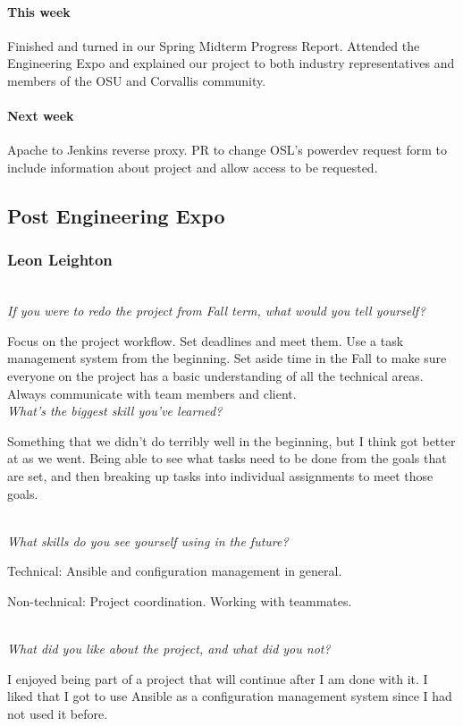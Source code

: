 \documentclass[10pt,letterpaper,onecolumn,draftclsnofoot]{IEEEtran}
\begin{document}
\paragraph{This week}Finished and turned in our Spring Midterm Progress Report.  
Attended the Engineering Expo and explained our project to both industry representatives and members of the OSU and Corvallis community.  
\paragraph{Next week}Apache to Jenkins reverse proxy.  
PR to change OSL's powerdev request form to include information about project and allow access to be requested.

\subsection{Post Engineering Expo}
\subsubsection{Leon Leighton}
\textit{\\If you were to redo the project from Fall term, what would you tell yourself?}

Focus on the project workflow. Set deadlines and meet them. Use a task management system from the beginning. Set aside time in the Fall to make sure everyone on the project has a basic understanding of all the technical areas. Always communicate with team members and client.
\textit{\\What's the biggest skill you've learned?}

Something that we didn't do terribly well in the beginning, but I think got better at as we went. Being able to see what tasks need to be done from the goals that are set, and then breaking up tasks into individual assignments to meet those goals.

\textit{\\What skills do you see yourself using in the future?}

Technical: Ansible and configuration management in general.

Non-technical: Project coordination. Working with teammates.

\textit{\\What did you like about the project, and what did you not?}

I enjoyed being part of a project that will continue after I am done with it. I liked that I got to use Ansible as a configuration management system since I had not used it before.
\end{document}
